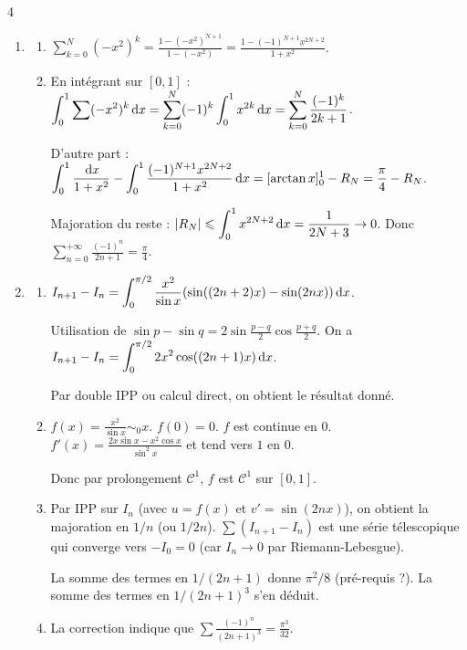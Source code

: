 \begin{correction}{4}
\begin{enumerate}
    \item
    \begin{enumerate}
        \item $\displaystyle \sum_{k=0}^N (-x^2)^k = \frac{1-(-x^2)^{N+1}}{1-(-x^2)} = \frac{1-(-1)^{N+1}x^{2N+2}}{1+x^2}$.
        \item 
            En intégrant sur $[0,1]$ :
            $\displaystyle \int_0^1 \sum (-x^2)^k \,\mathrm{d}x = \sum_{k=0}^N (-1)^k \int_0^1 x^{2k} \,\mathrm{d}x = \sum_{k=0}^N \frac{(-1)^k}{2k+1}$.

            D'autre part : $\displaystyle\int_0^1 \frac{\,\mathrm{d}x}{1+x^2} - \int_0^1 \frac{(-1)^{N+1}x^{2N+2}}{1+x^2} \,\mathrm{d}x = [\arctan x]_0^1 - R_N = \frac{\pi}{4} - R_N$.

            Majoration du reste : $\displaystyle |R_N| \leqslant \int_0^1 x^{2N+2} \,\mathrm{d}x = \frac{1}{2N+3} \to 0$.
            Donc $\displaystyle \sum_{n=0}^{+\infty} \frac{(-1)^n}{2n+1} = \frac{\pi}{4}$.
    \end{enumerate}
    
    \item
    \begin{enumerate}
        \item 
            $\displaystyle I_{n+1}-I_n = \int_0^{\pi/2} \frac{x^2}{\sin x} (\sin((2n+2)x) - \sin(2nx)) \,\mathrm{d}x$.
            
            Utilisation de $\sin p - \sin q = 2 \sin\frac{p-q}{2} \cos\frac{p+q}{2}$.
            On a $\displaystyle I_{n+1}-I_n = \int_0^{\pi/2} 2x^2 \cos((2n+1)x) \,\mathrm{d}x$.

            Par double IPP ou calcul direct, on obtient le résultat donné.

        \item 
            $f(x) = \frac{x^2}{\sin x} \sim_0 x$. $f(0)=0$. $f$ est continue en 0.
            $f'(x) = \frac{2x\sin x - x^2\cos x}{\sin^2 x}$ et tend vers $1$ en $0$.

            Donc par prolongement $\mathscr C^1$, $f$ est $\mathscr C^1$ sur $[0,1]$.

        \item
            Par IPP sur $I_n$ (avec $u=f(x)$ et $v'=\sin(2nx)$), on obtient la majoration en $1/n$ (ou $1/2n$).
            $\sum (I_{n+1}-I_n)$ est une série télescopique qui converge vers $-I_0 = 0$ (car $I_n \to 0$ par Riemann-Lebesgue).

            La somme des termes en $1/(2n+1)$ donne $\pi^2/8$ (pré-requis ?). La somme des termes en $1/(2n+1)^3$ s'en déduit.
        
        \item La correction indique que $\sum \frac{(-1)^n}{(2n+1)^3} = \frac{\pi^3}{32}$.
    \end{enumerate}
\end{enumerate}
\end{correction}

